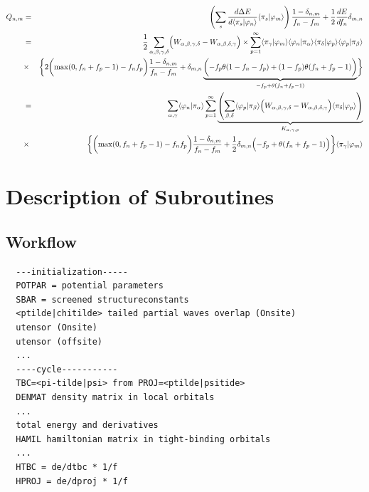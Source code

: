 \documentclass[11pt,a4paper]{report}
\begin{document}
\begin{eqnarray}
Q_{n,m}&=&
\left(
\sum_{s}\frac{d\Delta{E}}{d\langle\pi_s|\varphi_n\rangle}
\langle\pi_s|\varphi_m\rangle
\right)
\frac{1-\delta_{n,m}}{f_n-f_m}
+\frac{1}{2}\frac{dE}{df_n}\delta_{m,n}
\nonumber\\
&=&
\frac{1}{2}
\sum_{\alpha,\beta,\gamma,\delta} 
\Bigl(W_{\alpha,\beta,\gamma,\delta}-W_{\alpha,\beta,\delta,\gamma}\Bigr)
\times
\sum_{p=1}^\infty
\langle\pi_\gamma|\varphi_m\rangle
\langle\varphi_n|\pi_\alpha\rangle
\langle\pi_\delta|\varphi_p\rangle\langle\varphi_p|\pi_\beta\rangle
\nonumber\\
&\times&
\biggl\lbrace
2\biggl(\max(0,f_n+f_p-1)-f_nf_p\biggr)
\frac{1-\delta_{n,m}}{f_n-f_m}
+\delta_{m,n}
\underbrace{\biggl(-f_p\theta(1-f_n-f_p)+(1-f_p)\theta(f_n+f_p-1)\biggr)
}_{-f_p+\theta(f_n+f_p-1)}
\biggr\rbrace
\nonumber\\
&=&
\sum_{\alpha,\gamma} 
\langle\varphi_n|\pi_\alpha\rangle
\sum_{p=1}^\infty
\underbrace{\left(
\sum_{\beta,\delta} 
\langle\varphi_p|\pi_\beta\rangle
\Bigl(W_{\alpha,\beta,\gamma,\delta}-W_{\alpha,\beta,\delta,\gamma}\Bigr)
\langle\pi_\delta|\varphi_p\rangle
\right)}_{K_{\alpha,\gamma,p}}
\nonumber\\
&\times&
\biggl\lbrace
\biggl(\max(0,f_n+f_p-1)-f_nf_p\biggr)
\frac{1-\delta_{n,m}}{f_n-f_m}
+\frac{1}{2}
\delta_{m,n}\Bigl(-f_p+\theta(f_n+f_p-1)\Bigr)
\biggr\rbrace
\langle\pi_\gamma|\varphi_m\rangle
\nonumber\\
\end{eqnarray}

\chapter{Description of Subroutines}
\section{Workflow}
\begin{verbatim}
  ---initialization----- 
  POTPAR = potential parameters 
  SBAR = screened structureconstants 
  <ptilde|chitilde> tailed partial waves overlap (Onsite) 
  utensor (Onsite) 
  utensor (offsite) 
  ...  
  ----cycle-----------
  TBC=<pi-tilde|psi> from PROJ=<ptilde|psitide> 
  DENMAT density matrix in local orbitals 
  ...  
  total energy and derivatives 
  HAMIL hamiltonian matrix in tight-binding orbitals 
  ...  
  HTBC = de/dtbc * 1/f 
  HPROJ = de/dproj * 1/f
\end{verbatim}
\end{document}
